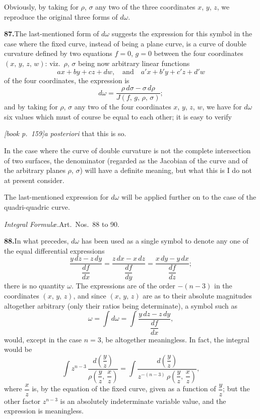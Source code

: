 \documentclass[11pt,a4paper]{article}
\begin{document}
Obviously, by taking for $\rho$, $\sigma$ any two of the three coordinates $x$, $y$, $z$, we reproduce the original three forms of $d\omega$.

\medskip\noindent\textbf{87.}\quad The last-mentioned form of $d\omega$ suggests the expression for this symbol in the case where the fixed curve, instead of being a plane curve, is a curve of double curvature defined by two equations $f = 0$, $g = 0$ between the four coordinates $(x,\,y,\,z,\,w)$: viz.\ $\rho$, $\sigma$ being now arbitrary linear functions
\[
ax + by + cz + dw,\quad\text{and}\quad a'x + b'y + c'z + d'w
\]
of the four coordinates, the expression is
\[
d\omega = \frac{\rho\,d\sigma - \sigma\,d\rho}{J(f,\,g,\,\rho,\,\sigma)};
\]
and by taking for $\rho$, $\sigma$ any two of the four coordinates $x$, $y$, $z$, $w$, we have for $d\omega$ six values which must of course be equal to each other; it is easy to verify

\medskip\noindent\textit{[book p.~159]}\quad \textit{a posteriori} that this is so.

In the case where the curve of double curvature is not the complete intersection of two surfaces, the denominator (regarded as the Jacobian of the curve and of the arbitrary planes $\rho$, $\sigma$) will have a definite meaning, but what this is I do not at present consider.

The last-mentioned expression for $d\omega$ will be applied further on to the case of the quadri-quadric curve.

\medskip\noindent\textit{Integral Formul\ae.}\quad Art.\ Nos.\ 88 to 90.

\medskip\noindent\textbf{88.}\quad In what precedes, $d\omega$ has been used as a single symbol to denote any one of the equal differential expressions
\[
\frac{y\,dz - z\,dy}{\dfrac{df}{dx}} = \frac{z\,dx - x\,dz}{\dfrac{df}{dy}} = \frac{x\,dy - y\,dx}{\dfrac{df}{dz}};
\]
there is no quantity $\omega$. The expressions are of the order $-(n - 3)$ in the coordinates $(x,\,y,\,z)$, and since $(x,\,y,\,z)$ are as to their absolute magnitudes altogether arbitrary (only their ratios being determinate), a symbol such as
\[
\omega = \int d\omega = \int\frac{y\,dz - z\,dy}{\dfrac{df}{dx}},
\]
would, except in the case $n = 3$, be altogether meaningless. In fact, the integral would be
\[
\int z^{n-3}\,\frac{d\!\left(\dfrac{y}{z}\right)}{\rho\!\left(\dfrac{y}{z},\,\dfrac{x}{z}\right)} = \int\frac{d\!\left(\dfrac{y}{z}\right)}{z^{-(n-3)}\,\rho\!\left(\dfrac{y}{z},\,\dfrac{x}{z}\right)},
\]
where $\dfrac{x}{z}$ is, by the equation of the fixed curve, given as a function of $\dfrac{y}{z}$; but the other factor $z^{n-3}$ is an absolutely indeterminate variable value, and the expression is meaningless.
\end{document}
